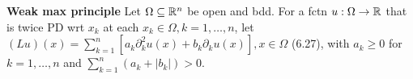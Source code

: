 {\bf Weak max principle} Let $\Omega \subseteq \mathbb{R}^n$ be open and bdd.  For a fctn $u: \Omega \rightarrow \mathbb{R}$ that is twice PD wrt $x_k$ at each $x_k \in \Omega, k = 1, \dots, n$, let $(Lu)(x) = \sum_{k=1}^n [a_k \partial_k^2 u(x) + b_k \partial_k u(x)], x \in \Omega$ (6.27), with $a_k \geq 0$ for $k = 1, \dots, n$ and $\sum_{k=1}^n (a_k + |b_k|) > 0$. 
